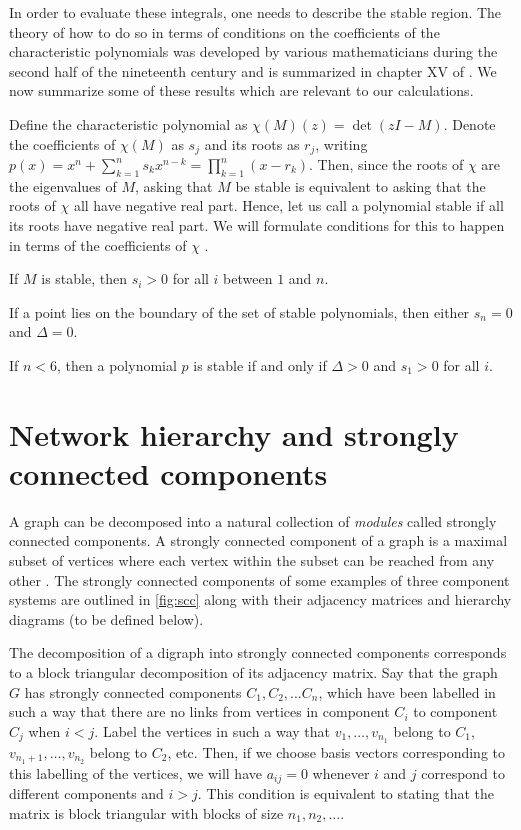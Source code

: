 In order to evaluate these integrals, one needs to describe the stable region.
The theory of how to do so in terms of conditions on the coefficients of the
characteristic polynomials was developed by various mathematicians during the
second half of the nineteenth century and is summarized in chapter XV of
\cite{Gantmacher1959}.  We now summarize some of these results which are
relevant to our calculations.

Define the characteristic polynomial as $\chi(M)(z) = \det(zI - M)$.
Denote the coefficients of $\chi(M)$ as $s_j$ and its roots as $r_j$,
writing $p(x) = x^n + \sum_{k=1}^n s_k x^{n-k} = \prod_{k=1}^n (x-r_k)$.
Then, since the roots of $\chi$ are the eigenvalues of $M$, asking that
$M$ be stable is equivalent to asking that the roots of $\chi$ all have
negative real part.  Hence, let us call a polynomial stable if all its
roots have negative real part.  We will formulate conditions for this to
happen in terms of the coefficients of $\chi$ \cite{Gantmacher1959}.

\begin{lemma}
If $M$ is stable, then $s_i > 0$ for all $i$ between $1$ and $n$.
\end{lemma}
\begin{lemma}
If a point lies on the boundary of the set of stable polynomials, then
either $s_n = 0$ and $\Delta = 0$.
\end{lemma}
\begin{lemma}
If $n < 6$, then a polynomial $p$ is stable if and only
if $\Delta > 0$ and $s_1 > 0$ for all $i$.
\end{lemma}

\section{Network hierarchy and strongly connected components}

A graph can be decomposed into a natural collection of \emph{modules} called strongly connected components. A strongly connected component of a graph is a maximal subset of vertices where each vertex within the subset can be reached from any other \cite{Cormen2009}. The strongly connected components of some examples of three component systems are outlined in \ref{fig:scc} along with their adjacency matrices and hierarchy diagrams (to be defined below).

The decomposition of a digraph into strongly connected components corresponds to a block triangular decomposition of its adjacency matrix.  Say that the graph $G$ has strongly connected components $C_1, C_2, \ldots C_n$, which have been labelled in such a way that there are no links from vertices in component $C_i$ to component $C_j$ when $i < j$.  Label the vertices in such a way that $v_1, \ldots, v_{n_1}$ belong to $C_1$, $v_{n_1 + 1}, \ldots, v_{n_2}$ belong to $C_2$, etc.  Then, if we choose basis vectors corresponding to this labelling of the vertices, we will have $a_{ij} = 0$ whenever $i$ and $j$ correspond to different components and $i > j$.  This condition is equivalent to stating that the matrix is block triangular with blocks of size $n_1, n_2, \ldots$.

